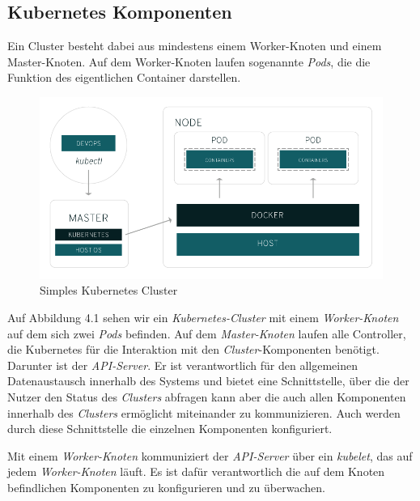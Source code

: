 \documentclass[12pt,a4paper]{scrartcl}
\begin{document}
\subsection{Kubernetes Komponenten}

Ein Cluster besteht dabei aus mindestens einem Worker-Knoten und einem Master-Knoten. Auf dem Worker-Knoten laufen sogenannte \emph{Pods}, die die Funktion des eigentlichen Container darstellen. 

\begin{figure}[h!]
	\centering
	\includegraphics[scale=0.5]{KubeSimpleCluster.png}
	\caption[https://www.redhat.com/de/topics/containers/what-is-kubernetes]{Simples Kubernetes Cluster}
\end{figure}

Auf Abbildung 4.1 sehen wir ein \emph{Kubernetes-Cluster} mit einem \emph{Worker-Knoten} auf dem sich zwei \emph{Pods} befinden. Auf dem \emph{Master-Knoten} laufen alle Controller, die Kubernetes für die Interaktion mit den \emph{Cluster}-Komponenten benötigt. Darunter ist der \emph{API-Server}. Er ist verantwortlich für den allgemeinen Datenaustausch innerhalb des Systems und bietet eine Schnittstelle, über die der Nutzer den Status des \emph{Clusters} abfragen kann aber die auch allen Komponenten innerhalb des \emph{Clusters} ermöglicht miteinander zu kommunizieren. Auch werden durch diese Schnittstelle die einzelnen Komponenten konfiguriert.

Mit einem \emph{Worker-Knoten} kommuniziert der \textit{API-Server} über ein \emph{kubelet}, das auf jedem \emph{Worker-Knoten} läuft. Es ist dafür verantwortlich die auf dem Knoten befindlichen Komponenten zu konfigurieren und zu überwachen. 
\end{document}
